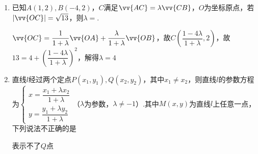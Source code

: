 \begin{enumerate}
\begin{enumerate}
        \item 已知$A(1,2), B(-4,2)$，$C$满足$\vv{AC} = \lambda \vv{CB}$，$O$为坐标原点，若$|\vv{OC}| = \sqrt{13}$，则$\lambda = $.
        \begin{jieda}
            $\vv{OC} = \dfrac{1}{1+\lambda} \vv{OA} + \dfrac{\lambda}{1+\lambda} \vv{OB}$，故$C\left(\dfrac{1-4\lambda}{1+\lambda}, 2\right)$，故$13 = 4 + \left(\dfrac{1-4\lambda}{1+\lambda}\right)^2$，解得$\lambda = 4$
        \end{jieda}
 
        \item 直线$l$经过两个定点$P(x_1, y_1), Q(x_2, y_2)$，其中$x_1 \neq x_2$，则直线$l$的参数方程为$\left \{ \begin{array}{l}
             x = \dfrac{x_1 + \lambda x_2}{1+\lambda} \\
             y = \dfrac{y_1 + \lambda y_2}{1+\lambda}
        \end{array} \right.$（$\lambda$为参数，$\lambda \neq -1$）.其中$M(x, y)$为直线$l$上任意一点，下列说法不正确的是
        \begin{jieda}
            表示不了$Q$点
        \end{jieda}
    \end{enumerate}
    

\end{enumerate}
